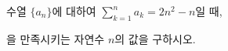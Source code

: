 수열 $\{a_n\}$에 대하여 $\displaystyle\sum_{k=1}^{n}a_k=2n^2-n$일 때, \par\smallskip{}\par\smallskip\noindent 을 만족시키는 자연수 $n$의 값을 구하시오.
